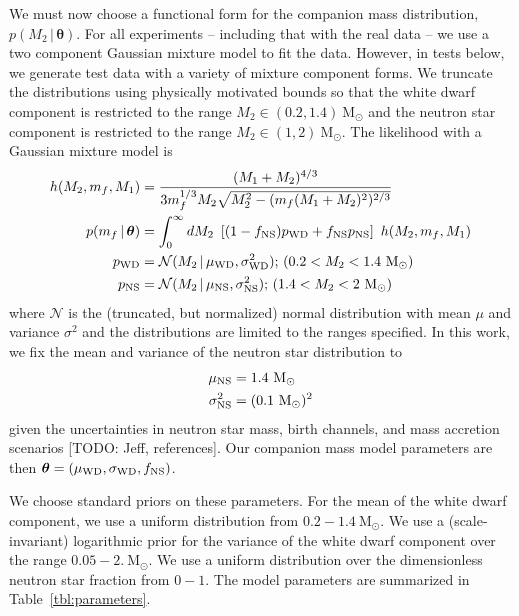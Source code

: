 \documentclass[letterpaper,12pt,preprint]{aastex}
\newcommand{\given}{\,|\,}
\newcommand{\Msun}{\mathrm{M}_\odot}
\newcommand{\bs}[1]{\boldsymbol{#1}}
\begin{document}
We must now choose a functional form for the companion mass distribution,  $p(M_2\given \bs{\theta})$. For all experiments -- including that with the real data -- we use a two component Gaussian mixture model to fit the data. However, in tests below, we generate test data with a variety of mixture component forms. We truncate the distributions using physically motivated bounds so that the white dwarf component is restricted to the range $M_2\in (0.2,1.4)~\Msun$ and the neutron star component is restricted to the range $M_2\in (1,2)~\Msun$. The likelihood with a Gaussian mixture model is
\begin{align}
	h(M_2, m_f, M_1) &= \frac{(M_1+M_2)^{4/3}}{3m_f^{1/3}M_2\sqrt{M_2^2 - (m_f(M_1+M_2)^2)^{2/3}}}\\
	p(m_f \given \bs{\theta}) &= \int_{0}^\infty dM_2~\left[ (1-f_{\rm NS})p_{\rm WD} + f_{\rm NS}p_{\rm NS} \right]~h(M_2, m_f, M_1)\\
	p_{\rm WD} &= \mathcal{N}(M_2 \given \mu_{\rm WD}, \sigma^2_{\rm WD});\,(0.2 < M_2 < 1.4~\Msun) \\
	p_{\rm NS} &= \mathcal{N}(M_2 \given \mu_{\rm NS}, \sigma^2_{\rm NS});\,(1.4 < M_2 < 2~\Msun)
\end{align}
where $\mathcal{N}$ is the (truncated, but normalized) normal distribution with mean $\mu$ and variance $\sigma^2$ and the distributions are limited to the ranges specified. In this work, we fix the mean and variance of the neutron star distribution to
\begin{align}
	\mu_{\rm NS} &= 1.4~\Msun\\
	\sigma^2_{\rm NS} &= (0.1~\Msun)^2
\end{align}
given the uncertainties in neutron star mass, birth channels, and mass accretion scenarios \citep{refs} [TODO: Jeff, references]. Our companion mass model parameters are then $\bs{\theta} = (\mu_{\rm WD}, \sigma_{\rm WD}, f_{\rm NS})$.

We choose standard priors on these parameters. For the mean of the white dwarf component, we use a uniform distribution from $0.2-1.4~\Msun$. We use a (scale-invariant) logarithmic prior for the variance of the white dwarf component over the range $0.05-2.~\Msun$. We use a uniform distribution over the dimensionless neutron star fraction from $0-1$. The model parameters are summarized in Table~\ref{tbl:parameters}.
\end{document}
